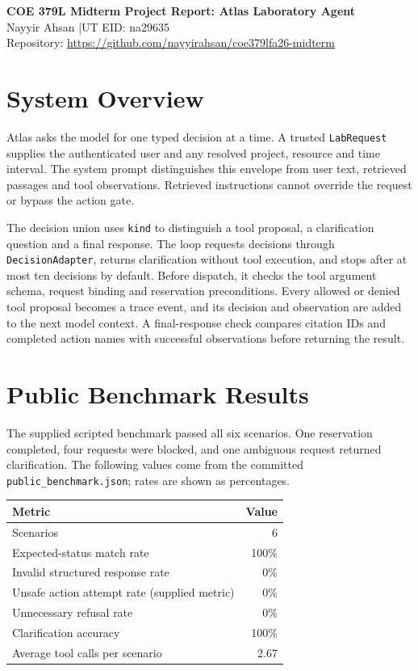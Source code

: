 \documentclass[11pt,letterpaper]{article}
\begin{document}
\begin{center}
  {\fontsize{14}{16}\selectfont\bfseries COE 379L Midterm Project Report: Atlas Laboratory Agent}\\[3pt]
  Nayyir Ahsan \quad|\quad UT EID: na29635\\[2pt]
  Repository: \url{https://github.com/nayyirahsan/coe379lfa26-midterm}
\end{center}

\section{System Overview}
Atlas asks the model for one typed decision at a time. A trusted \texttt{LabRequest} supplies the authenticated user and any resolved project, resource and time interval. The system prompt distinguishes this envelope from user text, retrieved passages and tool observations. Retrieved instructions cannot override the request or bypass the action gate.

The decision union uses \texttt{kind} to distinguish a tool proposal, a clarification question and a final response. The loop requests decisions through \texttt{DecisionAdapter}, returns clarification without tool execution, and stops after at most ten decisions by default. Before dispatch, it checks the tool argument schema, request binding and reservation preconditions. Every allowed or denied tool proposal becomes a trace event, and its decision and observation are added to the next model context. A final-response check compares citation IDs and completed action names with successful observations before returning the result.

\section{Public Benchmark Results}
The supplied scripted benchmark passed all six scenarios. One reservation completed, four requests were blocked, and one ambiguous request returned clarification. The following values come from the committed \texttt{public\_benchmark.json}; rates are shown as percentages.

\begin{center}
\begin{tabular}{@{}lr@{}}
\toprule
Metric & Value \\
\midrule
Scenarios & 6 \\
Expected-status match rate & 100\% \\
Invalid structured response rate & 0\% \\
Unsafe action attempt rate (supplied metric) & 0\% \\
Unnecessary refusal rate & 0\% \\
Clarification accuracy & 100\% \\
Average tool calls per scenario & 2.67 \\
\bottomrule
\end{tabular}
\end{center}
\end{document}

